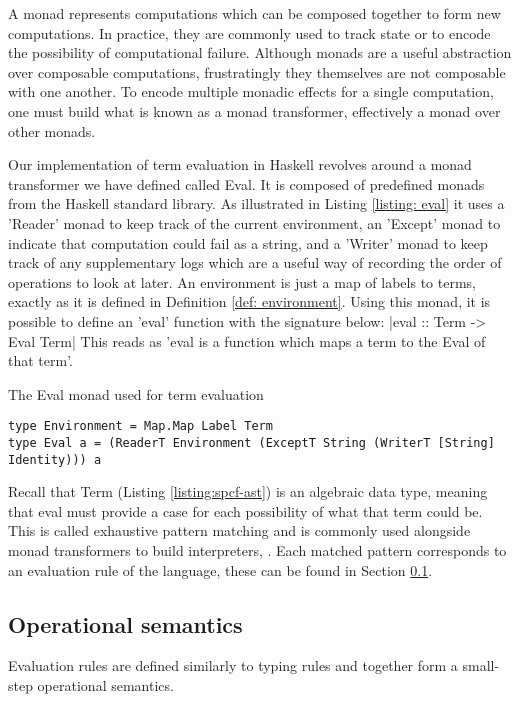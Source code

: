 \documentclass[12pt,a4paper]{report}
\theoremstyle{definition}
\theoremstyle{remark}
\begin{document}
A monad represents computations which can be composed together to form new computations. In practice, they are commonly used to track state or to encode the possibility of computational failure. Although monads are a useful abstraction over composable computations, frustratingly they themselves are not composable with one another. To encode multiple monadic effects for a single computation, one must build what is known as a monad transformer, effectively a monad over other monads.

Our implementation of term evaluation in Haskell revolves around a monad transformer we have defined called Eval. It is composed of predefined monads from the Haskell standard library. As illustrated in Listing \ref{listing: eval} it uses a 'Reader' monad to keep track of the current environment, an 'Except' monad to indicate that computation could fail as a string, and a 'Writer' monad to keep track of any supplementary logs which are a useful way of recording the order of operations to look at later. An environment is just a map of labels to terms, exactly as it is defined in Definition \ref{def: environment}. Using this monad, it is possible to define an 'eval' function with the signature below:
|eval :: Term -> Eval Term|
This reads as 'eval is a function which maps a term to the Eval of that term'. 

\begin{listing}
\caption{The Eval monad used for term evaluation}
\begin{verbatim}
type Environment = Map.Map Label Term
type Eval a = (ReaderT Environment (ExceptT String (WriterT [String] Identity))) a
\end{verbatim}
\label{listing: eval}
\end{listing}

Recall that Term (Listing \ref{listing:spcf-ast}) is an algebraic data type, meaning that eval must provide a case for each possibility of what that term could be. This is called exhaustive pattern matching and is commonly used alongside monad transformers to build interpreters, \citep[\emph{e.g.},][]{Liang1995MonadTA}. Each matched pattern corresponds to an evaluation rule of the language, these can be found in Section \ref{section: op sem}.

\subsection{Operational semantics}\label{section: op sem}
Evaluation rules are defined similarly to typing rules and together form a small-step operational semantics.
\end{document}
